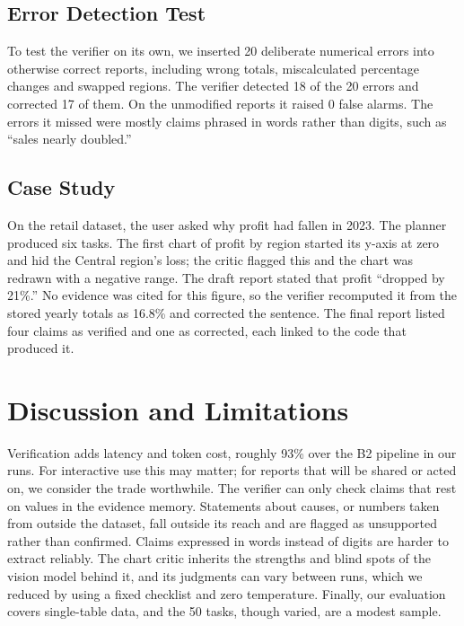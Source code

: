 \documentclass[conference]{IEEEtran}
\newcommand{\res}[1]{\textcolor{red}{#1}}
\newcommand{\INJdetected}{\res{18}}  %
\newcommand{\INJcorrected}{\res{17}} %
\newcommand{\OVERHEAD}{\res{93}}
\newcommand{\FALSEALARMS}{\res{0}}   %
\renewcommand{\res}[1]{#1}   %
\begin{document}
\subsection{Error Detection Test}
To test the verifier on its own, we inserted 20 deliberate numerical errors into otherwise correct reports, including wrong totals, miscalculated percentage changes and swapped regions. The verifier detected \INJdetected{} of the 20 errors and corrected \INJcorrected{} of them. On the unmodified reports it raised \FALSEALARMS{} false alarms. The errors it missed were mostly claims phrased in words rather than digits, such as ``sales nearly doubled.'' %

\subsection{Case Study}
On the retail dataset, the user asked why profit had fallen in 2023. The planner produced six tasks. The first chart of profit by region started its y-axis at zero and hid the Central region's loss; the critic flagged this and the chart was redrawn with a negative range. The draft report stated that profit ``dropped by 21\%.'' No evidence was cited for this figure, so the verifier recomputed it from the stored yearly totals as 16.8\% and corrected the sentence. The final report listed four claims as verified and one as corrected, each linked to the code that produced it. %

\section{Discussion and Limitations}

Verification adds latency and token cost, roughly \OVERHEAD{}\% over the B2 pipeline in our runs. For interactive use this may matter; for reports that will be shared or acted on, we consider the trade worthwhile. The verifier can only check claims that rest on values in the evidence memory. Statements about causes, or numbers taken from outside the dataset, fall outside its reach and are flagged as unsupported rather than confirmed. Claims expressed in words instead of digits are harder to extract reliably. The chart critic inherits the strengths and blind spots of the vision model behind it, and its judgments can vary between runs, which we reduced by using a fixed checklist and zero temperature. Finally, our evaluation covers single-table data, and the 50 tasks, though varied, are a modest sample.
\end{document}
